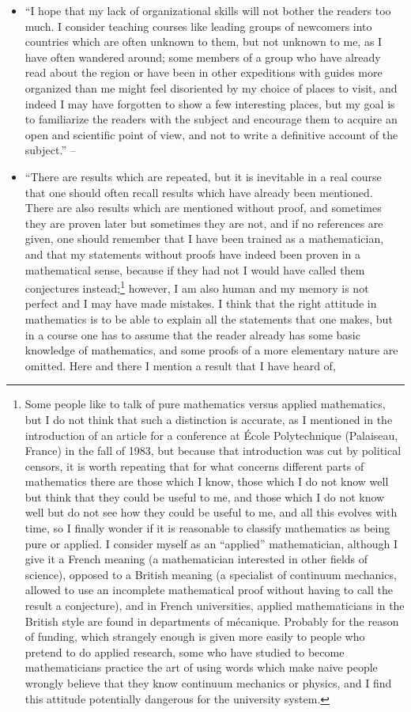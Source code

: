 \documentclass[oneside]{book}
\numberwithin{equation}{section}
\begin{document}
\begin{enumerate}
\begin{itemize}
		\item ``I hope that my lack of organizational skills will not bother the readers too much. I consider teaching courses like leading groups of newcomers into countries which are often unknown to them, but not unknown to me, as I have often wandered around; some members of a group who have already read about the region or have been in other expeditions with guides more organized than me might feel disoriented by my choice of places to visit, and indeed I may have forgotten to show a few interesting places, but my goal is to familiarize the readers with the subject and encourage them to acquire an open and scientific point of view, and not to write a definitive account of the subject.'' -- \cite[Preface, p. xii]{Tartar2006}
		\item ``There are results which are repeated, but it is inevitable in a real course that one should often recall results which have already been mentioned. There are also results which are mentioned without proof, and sometimes they are proven later but sometimes they are not, and if no references are given, one should remember that I have been trained as a mathematician, and that my statements without proofs have indeed been proven in a mathematical sense, because if they had not I would have called them conjectures instead;\footnote{Some people like to talk of pure mathematics versus applied mathematics, but I do not think that such a distinction is accurate, as I mentioned in the introduction of an article for a conference at \'Ecole Polytechnique (Palaiseau, France) in the fall of 1983, but because that introduction was cut by political censors, it is worth repeating that for what concerns different parts of mathematics there are those which I know, those which I do not know well but think that they could be useful to me, and those which I do not know well but do not see how they could be useful to me, and all this evolves with time, so I finally wonder if it is reasonable to classify mathematics as being pure or applied. I consider myself as an ``applied'' mathematician, although I give it a French meaning (a mathematician interested in other fields of science), opposed to a British meaning (a specialist of continuum mechanics, allowed to use an incomplete mathematical proof without having to call the result a conjecture), and in French universities, applied mathematicians in the British style are found in departments of m\'ecanique. Probably for the reason of funding, which strangely enough is given more easily to people who pretend to do applied research, some who have studied to become mathematicians practice the art of using words which make naive people wrongly believe that they know continuum mechanics or physics, and I find this attitude potentially dangerous for the university system.} however, I am also human and my memory is not perfect and I may have made mistakes. I think that the right attitude in mathematics is to be able to explain all the statements that one makes, but in a course one has to assume that the reader already has some basic knowledge of mathematics, and some proofs of a more elementary nature are omitted. Here and there I mention a result that I have heard of, 
\end{itemize}
\end{enumerate}
\end{document}
